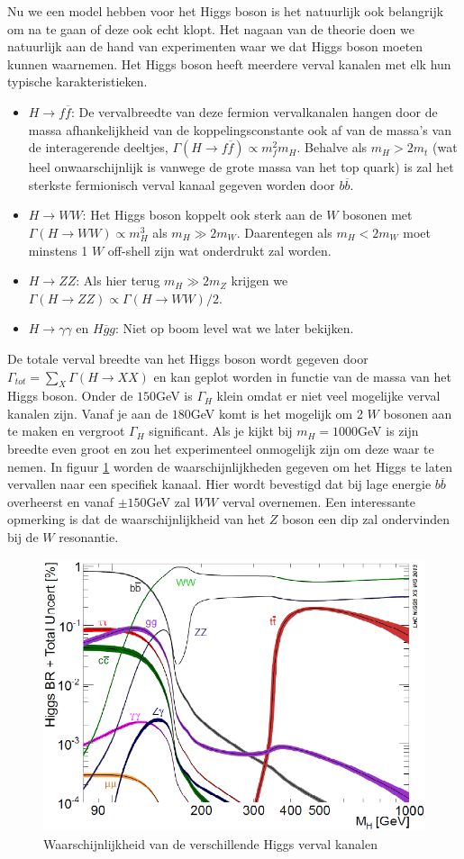 \documentclass[../main.tex]{subfiles}
\begin{document}
Nu we een model hebben voor het Higgs boson is het natuurlijk ook belangrijk om na te gaan of deze ook echt klopt. Het nagaan van de theorie doen we natuurlijk aan de hand van experimenten waar we dat Higgs boson moeten kunnen waarnemen. Het Higgs boson heeft meerdere verval kanalen met elk hun typische karakteristieken.
\begin{itemize}
    \item $H\rightarrow f\overline f$: De vervalbreedte van deze fermion vervalkanalen hangen door de massa afhankelijkheid van de koppelingsconstante ook af van de massa's van de interagerende deeltjes, $\Gamma(H\rightarrow f\overline f) \propto m_f^2m_H$. Behalve als $m_H > 2m_t$ (wat heel onwaarschijnlijk is vanwege de grote massa van het top quark) is zal het sterkste fermionisch verval kanaal gegeven worden door $b\overline b$.
    \item $H\rightarrow WW$: Het Higgs boson koppelt ook sterk aan de $W$ bosonen met $\Gamma(H\rightarrow WW)\propto m_H^3$ als $m_H \gg 2m_W$. Daarentegen als $m_H < 2m_W$ moet minstens 1 $W$ off-shell zijn wat onderdrukt zal worden.
    \item $H\rightarrow ZZ$: Als hier terug $m_H \gg 2m_Z$ krijgen we $\Gamma(H\rightarrow ZZ)\propto \Gamma(H\rightarrow WW)/2$.
    \item $H\rightarrow \gamma\gamma$ en $H\overline gg$: Niet op boom level wat we later bekijken.
\end{itemize}
De totale verval breedte van het Higgs boson wordt gegeven door $\Gamma_{tot} = \sum_X \Gamma(H\rightarrow XX)$ en kan geplot worden in functie van de massa van het Higgs boson. Onder de $150$GeV is $\Gamma_H$ klein omdat er niet veel mogelijke verval kanalen zijn. Vanaf je aan de $180$GeV komt is het mogelijk om 2 $W$ bosonen aan te maken en vergroot $\Gamma_H$  significant. Als je kijkt bij $m_H=1000$GeV is zijn breedte even groot en zou het experimenteel onmogelijk zijn om deze waar te nemen. In figuur \ref{fig:higgs_boson/verval_higgs} worden de waarschijnlijkheden gegeven om het Higgs te laten vervallen naar een specifiek kanaal. Hier wordt bevestigd dat bij lage energie $b\overline b$ overheerst en vanaf $\pm 150$GeV zal $WW$ verval overnemen. Een interessante opmerking is dat de waarschijnlijkheid van het $Z$ boson een dip zal ondervinden bij de $W$ resonantie.

\begin{figure}[h]
    \centering
    \includegraphics[width=0.6\linewidth]{higgs_boson/verval_higgs.png}
    \caption{Waarschijnlijkheid van de verschillende Higgs verval kanalen}%
    \label{fig:higgs_boson/verval_higgs}
\end{figure}
\end{document}
